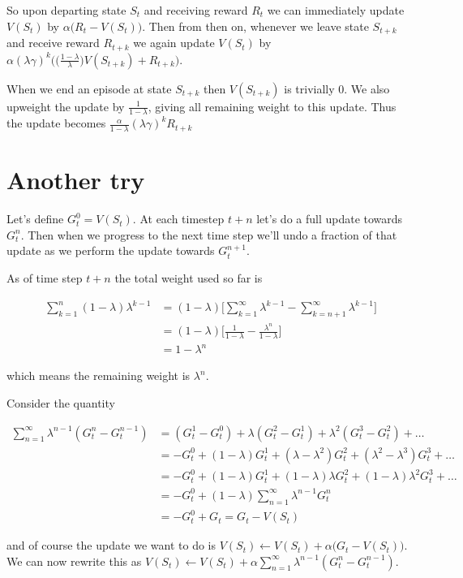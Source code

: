 \documentclass[11pt]{article}
\begin{document}
So upon departing state $S_t$ and receiving reward $R_t$ we can immediately update $V(S_t)$ by $\alpha\big(R_t - V(S_t)\big)$.
Then from then on, whenever we leave state $S_{t+k}$ and receive reward $R_{t +k}$ we again update $V(S_t)$ by
$\alpha (\lambda \gamma)^k \bigg(\big(\frac{1 - \lambda}{\lambda}\big)V(S_{t+k}) + R_{t+k} \bigg)$.

When we end an episode at state $S_{t+k}$ then $V(S_{t+k})$ is trivially 0.
We also upweight the update by $\frac{1}{1 - \lambda}$, giving all remaining weight to this update.
Thus the update becomes $\frac{\alpha}{1 - \lambda} (\lambda \gamma)^k R_{t+k}$

\section{Another try}
Let's define $G^0_t = V(S_t)$.
At each timestep $t + n$ let's do a full update towards $G^n_t$.
Then when we progress to the next time step we'll undo a fraction of that update as we perform the update towards $G^{n+1}_t$.

As of time step $t + n$ the total weight used so far is

\begin{align*}
\sum_{k=1}^n (1 - \lambda) \lambda^{k - 1} &= (1 - \lambda) \big[ \sum_{k=1}^\infty \lambda^{k - 1} - \sum_{k=n+1}^\infty \lambda^{k - 1} \big] \\
&= (1 - \lambda) \big[ \frac{1}{1 - \lambda} - \frac{\lambda^n}{1 - \lambda} \big] \\
&= 1 - \lambda^n
\end{align*}

which means the remaining weight is $\lambda^n$.

Consider the quantity

\begin{align*}
\sum_{n=1}^\infty \lambda^{n-1} (G^n_t - G^{n-1}_t) &= (G^1_t - G^0_t) + \lambda (G^2_t - G^1_t) + \lambda^2 (G^3_t - G^2_t) + \dots \\
&= -G^0_t + (1 - \lambda)G^1_t + (\lambda - \lambda^2)G^2_t + (\lambda^2 - \lambda^3)G^3_t + \dots \\
&= -G^0_t + (1 - \lambda)G^1_t + (1 - \lambda)\lambda G^2_t + (1 - \lambda)\lambda^2 G^3_t + \dots \\
&= -G^0_t + (1 - \lambda)\sum_{n=1}^\infty \lambda^{n - 1} G^n_t \\
&= -G^0_t + G_t = G_t - V(S_t)
\end{align*}

and of course the update we want to do is $V(S_t) \leftarrow V(S_t) + \alpha\big(G_t - V(S_t)\big)$.
We can now rewrite this as $V(S_t) \leftarrow V(S_t) + \alpha \sum_{n=1}^\infty \lambda^{n-1} (G^n_t - G^{n-1}_t)$.
\end{document}
